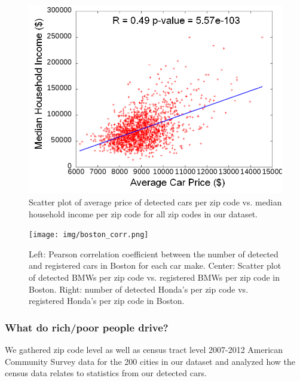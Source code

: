 \documentclass[10pt,twocolumn,letterpaper]{article}
\begin{document}
\begin{figure}[t]
\begin{center}
   \includegraphics[width=0.9\linewidth]{img/averagePriceIncome.png}
\end{center}
   \caption {Scatter plot of average price of detected cars per zip code vs. median household income per zip code for all zip codes in our dataset.}
\label{fig:price-income-corr}
\end{figure}

\begin{figure} [t]
\begin{center}
\texttt{[image: img/boston\_corr.png]}
\end{center}
\caption {Left: Pearson correlation coefficient between the number of detected and registered cars in Boston for each car make. Center: Scatter plot of detected BMWs per zip code vs. registered BMWs per zip code in Boston. Right: number of detected Honda's per zip code vs. registered Honda's per zip code in Boston.}
\label{fig:ma_corrs}
\end{figure}

\subsubsection{What do rich/poor people drive?}
We gathered zip code level as well as census tract level 2007-2012 American Community Survey data for the 200 cities in our dataset and analyzed how the census data relates to statistics from our detected cars. 
\end{document}
